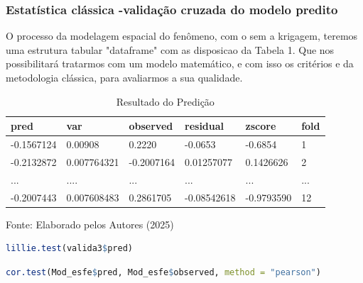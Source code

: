  \subsubsection{Estatística clássica -validação cruzada do modelo predito }
 
 \hspace*{1.25 cm} O processo da modelagem espacial do fenômeno, com o sem a krigagem, teremos uma estrutura tabular "dataframe" com as disposicao da Tabela 1. Que nos possibilitará tratarmos com um modelo matemático, e  com isso os critérios e da metodologia clássica, para avaliarmos a sua qualidade.
 \begin{table}[h!t]
 	\centering
 	\begin{threeparttable}
 		\caption{Resultado do Predição }
 		\label{Tabela-entrada-avalia5do}
 		\begin{tabular}{ l l l l ll}
 			\toprule
pred&	var&	observed&	residual&	zscore&	fold	 \\\midrule
-0.1567124&0.00908&0.2220&-0.0653&-0.6854&	1 	 \\ 
-0.2132872&	0.007764321	&-0.2007164	&	0.01257077&	0.1426626&	2 \\ 
...&	....&	...&	...&...&... \\ 
-0.2007443	&0.007608483&	0.2861705&	-0.08542618&-0.9793590	&12 \\ 
\bottomrule
 		\end{tabular}%
 		\begin{tablenotes}
 			\item [{\normalsize Fonte:     Elaborado pelos Autores (2025)}]  
 		\end{tablenotes}
 	\end{threeparttable}
 \end{table}
 
 
 \lstset{
 	language=R, %
 	caption= Teste Lilliefors (Kolmogorov\_Smirnov)em linguagem R,} %
 \begin{lstlisting}[language=R]
 	lillie.test(valida3$pred)
 \end{lstlisting}  
 
 \lstset{
 	language=R, %
 	caption= Teste de correlação em linguagem R,} %
 \begin{lstlisting}[language=R]
 	cor.test(Mod_esfe$pred, Mod_esfe$observed, method = "pearson")
 \end{lstlisting} 
 
